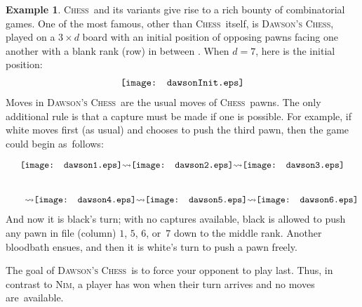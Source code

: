 \documentclass[12pt]{amsart}
\numberwithin{equation}{section}
\theoremstyle{definition}
\newtheorem{example}[thm]{Example}
\begin{document}
\begin{example}\label{e:dawson}
{\textsc{Chess}}\ and its variants give rise to a rich bounty of combinatorial
games.  One of the most famous, other than {\textsc{Chess}}\ itself, is {\textsc{Dawson's Chess}},
played on a $3 \times d$ board with an initial position of opposing
pawns facing one another with a blank rank (row) in between
\cite{dawson}.  When $d = 7$, here is the initial position:
$$\begin{array}{@{}c@{}}\texttt{[image: dawsonInit.eps]}\end{array}
$$
Moves in {\textsc{Dawson's Chess}}\ are the usual moves of {\textsc{Chess}}\ pawns.  The only
additional rule is that a capture must be made if one is possible.
For example, if white moves first (as usual) and chooses to push the
third pawn, then the game could begin as~follows:
$$\begin{array}{@{}c@{}}
\\[-2ex]
\begin{array}{@{}c@{}}\texttt{[image: dawson1.eps]}\end{array}
{\rightsquigarrow}
\begin{array}{@{}c@{}}\texttt{[image: dawson2.eps]}\end{array}
{\rightsquigarrow}
\begin{array}{@{}c@{}}\texttt{[image: dawson3.eps]}\end{array}
\\[6ex]\qquad
{\rightsquigarrow}
\begin{array}{@{}c@{}}\texttt{[image: dawson4.eps]}\end{array}
{\rightsquigarrow}
\begin{array}{@{}c@{}}\texttt{[image: dawson5.eps]}\end{array}
{\rightsquigarrow}
\begin{array}{@{}c@{}}\texttt{[image: dawson6.eps]}\end{array}
\end{array}
$$And now it is black's turn; with no captures available, black is
allowed to push any pawn in file (column) $1$, $5$, $6$, or~$7$ down
to the middle rank.  Another bloodbath ensues, and then it is white's
turn to push a pawn freely.

The goal of {\textsc{Dawson's Chess}}\ is to force your opponent to play last.  Thus, in
contrast to {\textsc{Nim}}, a player has won when their turn arrives and no
moves are~available.
\end{example}
\end{document}
